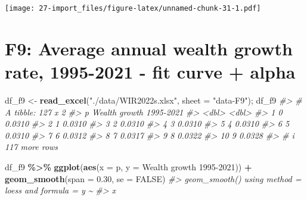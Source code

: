 \documentclass[
  xelatex, ja=standard]{bxjsbook}
\newenvironment{Shaded}{\begin{snugshade}}{\end{snugshade}}
\newcommand{\AttributeTok}[1]{\textcolor[rgb]{0.13,0.29,0.53}{#1}}
\newcommand{\CommentTok}[1]{\textcolor[rgb]{0.56,0.35,0.01}{\textit{#1}}}
\newcommand{\ConstantTok}[1]{\textcolor[rgb]{0.56,0.35,0.01}{#1}}
\newcommand{\FloatTok}[1]{\textcolor[rgb]{0.00,0.00,0.81}{#1}}
\newcommand{\FunctionTok}[1]{\textcolor[rgb]{0.13,0.29,0.53}{\textbf{#1}}}
\newcommand{\NormalTok}[1]{#1}
\newcommand{\OtherTok}[1]{\textcolor[rgb]{0.56,0.35,0.01}{#1}}
\newcommand{\SpecialCharTok}[1]{\textcolor[rgb]{0.81,0.36,0.00}{\textbf{#1}}}
\newcommand{\StringTok}[1]{\textcolor[rgb]{0.31,0.60,0.02}{#1}}
\theoremstyle{definition}
\theoremstyle{definition}
\theoremstyle{definition}
\theoremstyle{definition}
\theoremstyle{remark}
\begin{document}
\texttt{[image: 27-import\_files/figure-latex/unnamed-chunk-31-1.pdf]}

\hypertarget{f9-average-annual-wealth-growth-rate-1995-2021---fit-curve-alpha}{%
\section{F9: Average annual wealth growth rate, 1995-2021 - fit curve + alpha}\label{f9-average-annual-wealth-growth-rate-1995-2021---fit-curve-alpha}}

\begin{Shaded}
\begin{Highlighting}[]
\NormalTok{df\_f9 }\OtherTok{\textless{}{-}} \FunctionTok{read\_excel}\NormalTok{(}\StringTok{"./data/WIR2022s.xlsx"}\NormalTok{, }\AttributeTok{sheet =} \StringTok{"data{-}F9"}\NormalTok{); df\_f9}
\CommentTok{\#\textgreater{} \# A tibble: 127 x 2}
\CommentTok{\#\textgreater{}        p \textasciigrave{}Wealth growth 1995{-}2021\textasciigrave{}}
\CommentTok{\#\textgreater{}    \textless{}dbl\textgreater{}                     \textless{}dbl\textgreater{}}
\CommentTok{\#\textgreater{}  1     0                    0.0310}
\CommentTok{\#\textgreater{}  2     1                    0.0310}
\CommentTok{\#\textgreater{}  3     2                    0.0310}
\CommentTok{\#\textgreater{}  4     3                    0.0310}
\CommentTok{\#\textgreater{}  5     4                    0.0310}
\CommentTok{\#\textgreater{}  6     5                    0.0310}
\CommentTok{\#\textgreater{}  7     6                    0.0312}
\CommentTok{\#\textgreater{}  8     7                    0.0317}
\CommentTok{\#\textgreater{}  9     8                    0.0322}
\CommentTok{\#\textgreater{} 10     9                    0.0328}
\CommentTok{\#\textgreater{} \# i 117 more rows}
\end{Highlighting}
\end{Shaded}

\begin{Shaded}
\begin{Highlighting}[]
\NormalTok{df\_f9 }\SpecialCharTok{\%\textgreater{}\%} 
  \FunctionTok{ggplot}\NormalTok{(}\FunctionTok{aes}\NormalTok{(}\AttributeTok{x =}\NormalTok{ p, }\AttributeTok{y =} \StringTok{\textasciigrave{}}\AttributeTok{Wealth growth 1995{-}2021}\StringTok{\textasciigrave{}}\NormalTok{)) }\SpecialCharTok{+} \FunctionTok{geom\_smooth}\NormalTok{(}\AttributeTok{span =} \FloatTok{0.30}\NormalTok{, }\AttributeTok{se =} \ConstantTok{FALSE}\NormalTok{)}
\CommentTok{\#\textgreater{} \textasciigrave{}geom\_smooth()\textasciigrave{} using method = \textquotesingle{}loess\textquotesingle{} and formula = \textquotesingle{}y \textasciitilde{}}
\CommentTok{\#\textgreater{} x\textquotesingle{}}
\end{Highlighting}
\end{Shaded}
\end{document}
